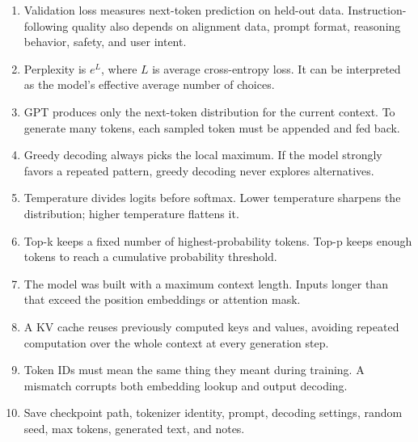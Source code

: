 \begin{enumerate}
  \item Validation loss measures next-token prediction on held-out data. Instruction-following quality also depends on alignment data, prompt format, reasoning behavior, safety, and user intent.
  \item Perplexity is \(e^L\), where \(L\) is average cross-entropy loss. It can be interpreted as the model's effective average number of choices.
  \item GPT produces only the next-token distribution for the current context. To generate many tokens, each sampled token must be appended and fed back.
  \item Greedy decoding always picks the local maximum. If the model strongly favors a repeated pattern, greedy decoding never explores alternatives.
  \item Temperature divides logits before softmax. Lower temperature sharpens the distribution; higher temperature flattens it.
  \item Top-k keeps a fixed number of highest-probability tokens. Top-p keeps enough tokens to reach a cumulative probability threshold.
  \item The model was built with a maximum context length. Inputs longer than that exceed the position embeddings or attention mask.
  \item A KV cache reuses previously computed keys and values, avoiding repeated computation over the whole context at every generation step.
  \item Token IDs must mean the same thing they meant during training. A mismatch corrupts both embedding lookup and output decoding.
  \item Save checkpoint path, tokenizer identity, prompt, decoding settings, random seed, max tokens, generated text, and notes.
\end{enumerate}
